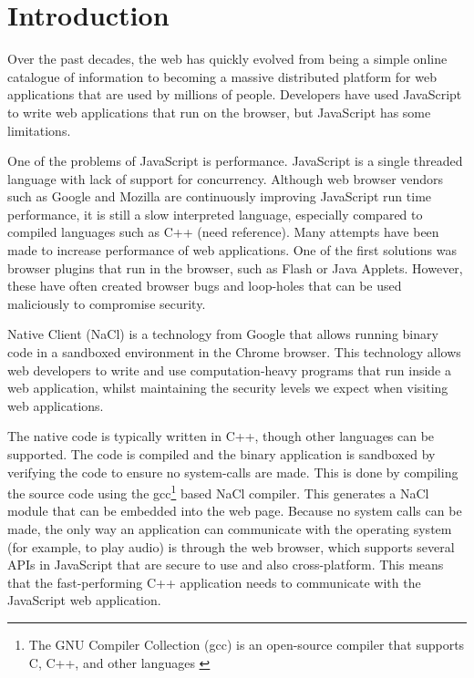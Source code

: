 \chapter{Introduction} 

\label{Chapter1}

Over the past decades, the web has quickly evolved from being a simple online catalogue of information to becoming a massive distributed platform for web applications that are used by millions of people. Developers have used JavaScript to write web applications that run on the browser, but JavaScript has some limitations. 

One of the problems of JavaScript is performance. JavaScript is a single threaded language with lack of support for concurrency. Although web browser vendors such as Google and Mozilla are continuously improving JavaScript run time performance, it is still a slow interpreted language, especially compared to compiled languages such as C++ (need reference). Many attempts have been made to increase performance of web applications. One of the first solutions was browser plugins that run in the browser, such as Flash or Java Applets. However, these have often created browser bugs and loop-holes that can be used maliciously to compromise security.

Native Client \cite{nacl} (NaCl) is a technology from Google that allows running binary code in a sandboxed environment in the Chrome browser. This technology allows web developers to write and use computation-heavy programs that run inside a web application, whilst maintaining the security levels we expect when visiting web applications.

The native code is typically written in C++, though other languages can be supported. The code is compiled and the binary application is sandboxed by verifying the code to ensure no system-calls are made. This is done by compiling the source code using the gcc\footnote{The GNU Compiler Collection (gcc) is an open-source compiler that supports C, C++, and other languages \cite{gcc}} based NaCl compiler. This generates a NaCl module that can be embedded into the web page. Because no system calls can be made, the only way an application can communicate with the operating system (for example, to play audio) is through the web browser, which supports several APIs in JavaScript that are secure to use and also cross-platform. This means that the fast-performing C++ application needs to communicate with the JavaScript web application.

